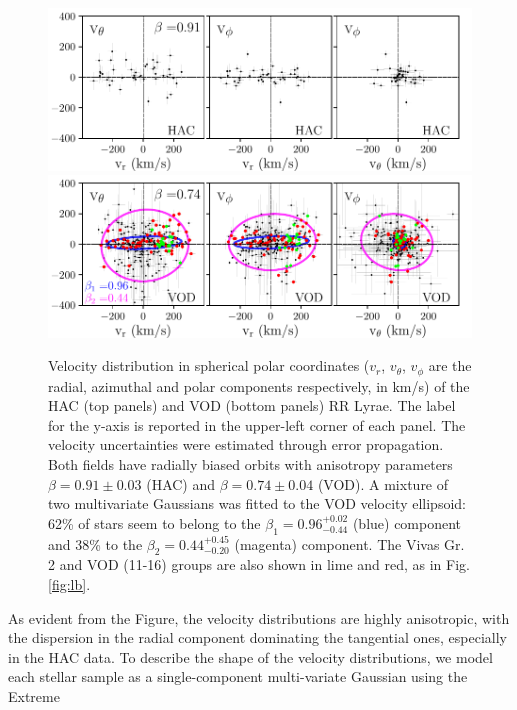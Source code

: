 \documentclass[fleqn,usenatbib]{mnras}
\begin{document}
\begin{figure}
	\includegraphics[scale=0.55]{HAC_allv.pdf}
  \includegraphics[scale=0.55]{VOD_allv.pdf}
   \vspace{-0.45cm}
    \caption{Velocity distribution in spherical polar coordinates
      ($v_{r}$, $v_{\theta}$, $v_{\phi}$ are the radial, azimuthal and
      polar components respectively, in km/s) of the HAC (top panels) and VOD (bottom panels) RR Lyrae.  The label for the y-axis is reported in the upper-left corner of each panel. The velocity uncertainties were estimated through error propagation. Both fields have radially biased orbits with anisotropy parameters $\beta= 0.91 \pm 0.03$ (HAC) and $\beta= 0.74 \pm 0.04$ (VOD). A mixture of two multivariate Gaussians was fitted to the VOD velocity ellipsoid: 62\% of stars seem to belong to the $\beta_{1}= 0.96^{+0.02}_{-0.44}$ (blue) component  and 38\%  to the $\beta_{2}=0.44^{+0.45}_{-0.20}$ (magenta) component. The Vivas Gr. 2 and VOD (11-16) groups are also shown in lime and red, as in Fig.\ref{fig:lb}.}
    \label{fig:vel}
\end{figure}
%
As evident from the Figure, the velocity distributions are highly
anisotropic, with the dispersion in the radial component dominating
the tangential ones, especially in the HAC data. To describe the shape
of the velocity distributions, we model each stellar sample as a
single-component multi-variate Gaussian using the Extreme
\end{document}
